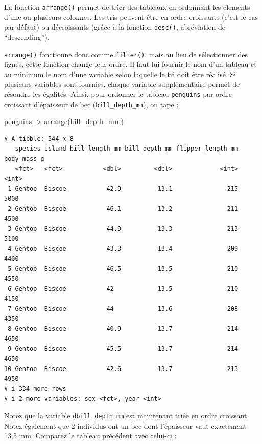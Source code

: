 \documentclass[
  a4paper,
  DIV=11,
  numbers=noendperiod,
  oneside]{scrreprt}
\newenvironment{Shaded}{}{}
\newcommand{\FunctionTok}[1]{\textcolor[rgb]{0.44,0.26,0.76}{#1}}
\newcommand{\NormalTok}[1]{\textcolor[rgb]{0.14,0.16,0.18}{#1}}
\newcommand{\SpecialCharTok}[1]{\textcolor[rgb]{0.00,0.36,0.77}{#1}}
\begin{document}
La fonction \texttt{arrange()} permet de trier des tableaux en ordonnant
les éléments d'une ou plusieurs colonnes. Les tris peuvent être en ordre
croissants (c'est le cas par défaut) ou décroissants (grâce à la
fonction \texttt{desc()}, abréviation de ``descending'').

\texttt{arrange()} fonctionne donc comme \texttt{filter()}, mais au lieu
de sélectionner des lignes, cette fonction change leur ordre. Il faut
lui fournir le nom d'un tableau et au minimum le nom d'une variable
selon laquelle le tri doit être réalisé. Si plusieurs variables sont
fournies, chaque variable supplémentaire permet de résoudre les
égalités. Ainsi, pour ordonner le tableau \texttt{penguins} par ordre
croissant d'épaisseur de bec (\texttt{bill\_depth\_mm}), on tape :

\begin{Shaded}
\begin{Highlighting}[]
\NormalTok{penguins }\SpecialCharTok{|\textgreater{}}
  \FunctionTok{arrange}\NormalTok{(bill\_depth\_mm)}
\end{Highlighting}
\end{Shaded}

\begin{verbatim}
# A tibble: 344 x 8
   species island bill_length_mm bill_depth_mm flipper_length_mm body_mass_g
   <fct>   <fct>           <dbl>         <dbl>             <int>       <int>
 1 Gentoo  Biscoe           42.9          13.1               215        5000
 2 Gentoo  Biscoe           46.1          13.2               211        4500
 3 Gentoo  Biscoe           44.9          13.3               213        5100
 4 Gentoo  Biscoe           43.3          13.4               209        4400
 5 Gentoo  Biscoe           46.5          13.5               210        4550
 6 Gentoo  Biscoe           42            13.5               210        4150
 7 Gentoo  Biscoe           44            13.6               208        4350
 8 Gentoo  Biscoe           40.9          13.7               214        4650
 9 Gentoo  Biscoe           45.5          13.7               214        4650
10 Gentoo  Biscoe           42.6          13.7               213        4950
# i 334 more rows
# i 2 more variables: sex <fct>, year <int>
\end{verbatim}

Notez que la variable \texttt{dbill\_depth\_mm} est maintenant triée en
ordre croissant. Notez également que 2 individus ont un bec dont
l'épaisseur vaut exactement 13,5 mm. Comparez le tableau précédent avec
celui-ci :
\end{document}
